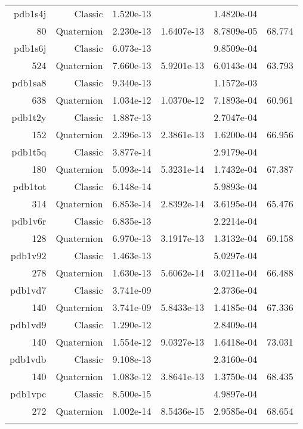 \begin{xltabular}{\textwidth}{r|rS[table-format=1.3e+2]S[table-format=1.4e+2]S[table-format=1.4e+2]S[table-format=-1.3]}
pdb1s4j & Classic & 1.520e-13 &  & 1.4820e-04 & \\
80 & Quaternion & 2.230e-13 & 1.6407e-13 & 8.7809e-05 & 68.774\\  \addlinespace
pdb1s6j & Classic & 6.073e-13 &  & 9.8509e-04 & \\
524 & Quaternion & 7.660e-13 & 5.9201e-13 & 6.0143e-04 & 63.793\\  \addlinespace
pdb1sa8 & Classic & 9.340e-13 &  & 1.1572e-03 & \\
638 & Quaternion & 1.034e-12 & 1.0370e-12 & 7.1893e-04 & 60.961\\  \addlinespace
pdb1t2y & Classic & 1.887e-13 &  & 2.7047e-04 & \\
152 & Quaternion & 2.396e-13 & 2.3861e-13 & 1.6200e-04 & 66.956\\  \addlinespace
pdb1t5q & Classic & 3.877e-14 &  & 2.9179e-04 & \\
180 & Quaternion & 5.093e-14 & 5.3231e-14 & 1.7432e-04 & 67.387\\  \addlinespace
pdb1tot & Classic & 6.148e-14 &  & 5.9893e-04 & \\
314 & Quaternion & 6.853e-14 & 2.8392e-14 & 3.6195e-04 & 65.476\\  \addlinespace
pdb1v6r & Classic & 6.835e-13 &  & 2.2214e-04 & \\
128 & Quaternion & 6.970e-13 & 3.1917e-13 & 1.3132e-04 & 69.158\\  \addlinespace
pdb1v92 & Classic & 1.463e-13 &  & 5.0297e-04 & \\
278 & Quaternion & 1.630e-13 & 5.6062e-14 & 3.0211e-04 & 66.488\\  \addlinespace
pdb1vd7 & Classic & 3.741e-09 &  & 2.3736e-04 & \\
140 & Quaternion & 3.741e-09 & 5.8433e-13 & 1.4185e-04 & 67.336\\  \addlinespace
pdb1vd9 & Classic & 1.290e-12 &  & 2.8409e-04 & \\
140 & Quaternion & 1.554e-12 & 9.0327e-13 & 1.6418e-04 & 73.031\\  \addlinespace
pdb1vdb & Classic & 9.108e-13 &  & 2.3160e-04 & \\
140 & Quaternion & 1.083e-12 & 3.8641e-13 & 1.3750e-04 & 68.435\\  \addlinespace
pdb1vpc & Classic & 8.500e-15 &  & 4.9897e-04 & \\
272 & Quaternion & 1.002e-14 & 8.5436e-15 & 2.9585e-04 & 68.654\\  \addlinespace

\end{xltabular}
